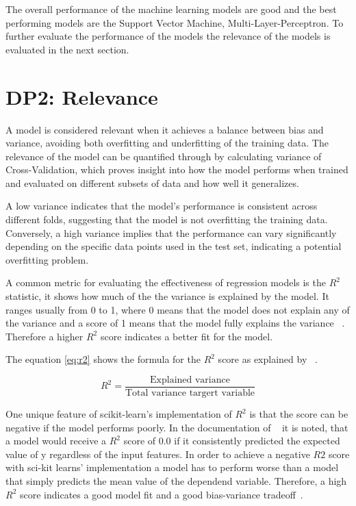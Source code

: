 The overall performance of the machine learning models are good and the best performing models are the
Support Vector Machine, Multi-Layer-Perceptron.
To further evaluate the performance of the models the relevance of the models is evaluated in the next section.


\section{DP2: Relevance}\label{sec:relevance}

A model is considered relevant when it achieves a balance between bias and
variance, avoiding both overfitting and underfitting of the training data.
The relevance of the model can be quantified through by calculating variance of Cross-Validation, which proves insight
into how the model performs when trained and
evaluated on different subsets of data and how well it generalizes.

A low variance indicates that the model's performance is consistent across
different folds, suggesting that the model is not overfitting the training data.
Conversely, a high variance implies that the performance can vary significantly
depending on the specific data points used in the test set, indicating a potential
overfitting problem.

A common metric for evaluating the effectiveness of regression models is the $R^2$ statistic, it shows how much of the
the variance is explained by the model.
It ranges usually from 0 to 1, where 0 means that the model does not explain any of the variance and a score of 1
means that the model fully explains the variance
~\cite[p. 43]{muller2016introduction}.
Therefore a higher $R^2$ score indicates a better fit for the model.

The equation \cref{eq:r2} shows the formula for the $R^2$ score as explained by
~\cite[p. 43]{muller2016introduction}.

\begin{tcolorbox}[arc=0pt,boxrule=0.5pt]
    \begin{equation}
        \label{eq:r2}
        R^2 = \frac{\text{Explained variance}}{\text{Total variance targert variable}}
    \end{equation}
\end{tcolorbox}

One unique feature of scikit-learn's implementation of $R^2$ is that the score can be negative if the model performs
poorly.
In the documentation of ~\cite{scikit-learn} it is noted, that a model would receive a $R^2$ score of 0.0 if it
consistently predicted the expected value of y regardless of the input features.
In order to achieve a negative $R2$ score with sci-kit learns' implementation a model has to perform worse than a
model that simply predicts the mean value of the dependend variable.
Therefore, a high $R^2$ score indicates a good model fit and a good bias-variance
tradeoff~\cite[p. 43]{muller2016introduction}.

